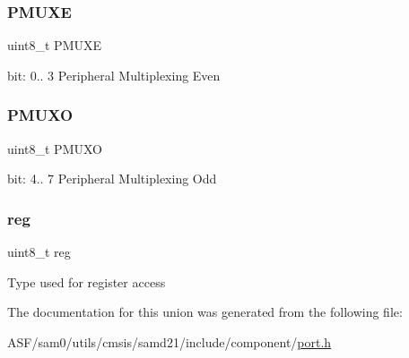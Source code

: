 \subsubsection{\texorpdfstring{PMUXE}{PMUXE}}
{\footnotesize\ttfamily uint8\+\_\+t P\+M\+U\+XE}

bit\+: 0.. 3 Peripheral Multiplexing Even \mbox{\label{union_p_o_r_t___p_m_u_x___type_a5281f7bf224ea3f385e94c491a55af68}} 
\subsubsection{\texorpdfstring{PMUXO}{PMUXO}}
{\footnotesize\ttfamily uint8\+\_\+t P\+M\+U\+XO}

bit\+: 4.. 7 Peripheral Multiplexing Odd \mbox{\label{union_p_o_r_t___p_m_u_x___type_a9428adc9af4653a2050e2536b55dec8d}} 
\subsubsection{\texorpdfstring{reg}{reg}}
{\footnotesize\ttfamily uint8\+\_\+t reg}

Type used for register access 

The documentation for this union was generated from the following file\+:\begin{DoxyCompactItemize}
\item 
A\+S\+F/sam0/utils/cmsis/samd21/include/component/\mbox{\hyperlink{utils_2cmsis_2samd21_2include_2component_2port_8h}{port.\+h}}\end{DoxyCompactItemize}
